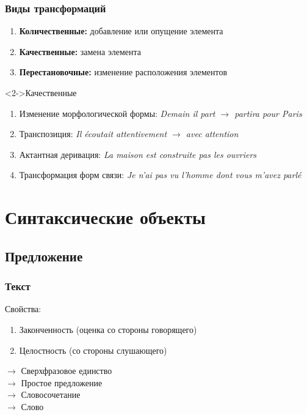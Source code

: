 \begin{frame}
  \frametitle{Виды трансформаций}

  \begin{enumerate}
    \item \textbf{Количественные:} добавление или опущение элемента
    \item \textbf{Качественные:} замена элемента
    \item \textbf{Перестановочные:} изменение расположения элементов
  \end{enumerate}

  \vfill

  \begin{block}<2->{Качественные}
    \begin{enumerate}
      \item Изменение морфологической формы: \textit{Demain il part $\rightarrow$ partira pour Paris}
      \item Транспозиция: \textit{Il écoutait attentivement $\rightarrow$ avec attention}
      \item Актантная деривация: \textit{La maison est construite pas les ouvriers}
      \item Трансформация форм связи: \textit{Je n'ai pas vu l'homme dont vous m'avez parlé}
    \end{enumerate}
  \end{block}
\end{frame}

\section{Синтаксические объекты}

\subsection{Предложение}

\begin{frame}
  \frametitle{Текст}

  Свойства: \begin{enumerate}
    \item Законченность (оценка со стороны говорящего)
    \item Целостность (со стороны слушающего)
  \end{enumerate}

  \vfill

  $\rightarrow$ Сверхфразовое единство \\
  $\rightarrow$ Простое предложение \\
  $\rightarrow$ Словосочетание \\
  $\rightarrow$ Слово
\end{frame}

